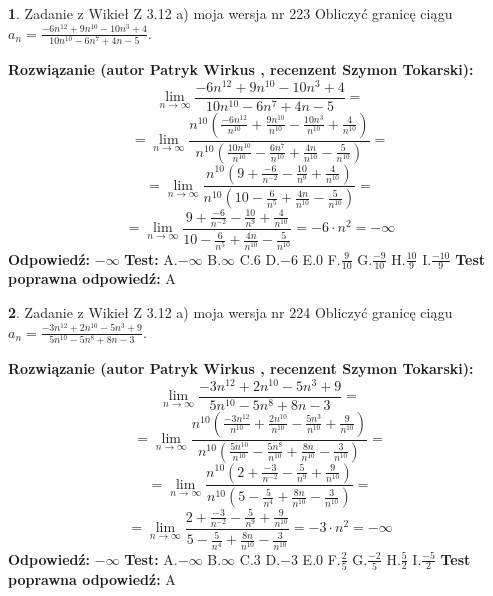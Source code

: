 \documentclass[12pt, a4paper]{article}
\theoremstyle{definition} %
\newtheorem{zad}{}
\newcommand{\zadStart}[1]{\begin{zad}#1\newline}
\newcommand{\zadStop}{\end{zad}}
\newcommand{\rozwStart}[2]{\noindent \textbf{Rozwiązanie (autor #1 , recenzent #2): }\newline}
\newcommand{\rozwStop}{\newline}
\newcommand{\odpStart}{\noindent \textbf{Odpowiedź:}\newline}
\newcommand{\odpStop}{\newline}
\newcommand{\testStart}{\noindent \textbf{Test:}\newline}
\newcommand{\testStop}{\newline}
\newcommand{\kluczStart}{\noindent \textbf{Test poprawna odpowiedź:}\newline}
\newcommand{\kluczStop}{\newline}
\begin{document}
\zadStart{Zadanie z Wikieł Z 3.12 a) moja wersja nr 223}
Obliczyć granicę ciągu $a_{n}=\frac{-6n^{12}+9n^{10}-10n^{3}+4}{10n^{10}-6n^{7}+4n-5}$.
\zadStop
\rozwStart{Patryk Wirkus}{Szymon Tokarski}
$$\lim\limits_{n\to\infty}\frac{-6n^{12}+9n^{10}-10n^{3}+4}{10n^{10}-6n^{7}+4n-5}=$$
$$=\lim\limits_{n\to\infty}\frac{n^{10}\left(\frac{-6n^{12}}{n^{10}}+\frac{9n^{10}}{n^{10}}-\frac{10n^{3}}{n^{10}}+\frac{4}{n^{10}}\right)}{n^{10}\left(\frac{10n^{10}}{n^{10}}-\frac{6n^{7}}{n^{10}}+\frac{4n}{n^{10}}-\frac{5}{n^{10}}\right)}=$$
$$=\lim\limits_{n\to\infty}\frac{n^{10}\left(9+\frac{-6}{n^{-2}}-\frac{10}{n^{9}}+\frac{4}{n^{10}}\right)}
{n^{10}\left(10-\frac{6}{n^{5}}+\frac{4n}{n^{10}}-\frac{5}{n^{10}}\right)}=$$
$$=\lim\limits_{n\to\infty}\frac{9+\frac{-6}{n^{-2}}-\frac{10}{n^{9}}+\frac{4}{n^{10}}}{10-\frac{6}{n^{5}}+\frac{4n}{n^{10}}-\frac{5}{n^{10}}}=-6\cdot n^{2} = -\infty$$
\rozwStop
\odpStart
$-\infty$
\odpStop
\testStart
A.$-\infty$
B.$\infty$
C.$6$
D.$-6$
E.$0$
F.$\frac{9}{10}$
G.$\frac{-9}{10}$
H.$\frac{10}{9}$
I.$\frac{-10}{9}$
\testStop
\kluczStart
A
\kluczStop



\zadStart{Zadanie z Wikieł Z 3.12 a) moja wersja nr 224}
Obliczyć granicę ciągu $a_{n}=\frac{-3n^{12}+2n^{10}-5n^{3}+9}{5n^{10}-5n^{8}+8n-3}$.
\zadStop
\rozwStart{Patryk Wirkus}{Szymon Tokarski}
$$\lim\limits_{n\to\infty}\frac{-3n^{12}+2n^{10}-5n^{3}+9}{5n^{10}-5n^{8}+8n-3}=$$
$$=\lim\limits_{n\to\infty}\frac{n^{10}\left(\frac{-3n^{12}}{n^{10}}+\frac{2n^{10}}{n^{10}}-\frac{5n^{3}}{n^{10}}+\frac{9}{n^{10}}\right)}{n^{10}\left(\frac{5n^{10}}{n^{10}}-\frac{5n^{8}}{n^{10}}+\frac{8n}{n^{10}}-\frac{3}{n^{10}}\right)}=$$
$$=\lim\limits_{n\to\infty}\frac{n^{10}\left(2+\frac{-3}{n^{-2}}-\frac{5}{n^{9}}+\frac{9}{n^{10}}\right)}
{n^{10}\left(5-\frac{5}{n^{4}}+\frac{8n}{n^{10}}-\frac{3}{n^{10}}\right)}=$$
$$=\lim\limits_{n\to\infty}\frac{2+\frac{-3}{n^{-2}}-\frac{5}{n^{9}}+\frac{9}{n^{10}}}{5-\frac{5}{n^{4}}+\frac{8n}{n^{10}}-\frac{3}{n^{10}}}=-3\cdot n^{2} = -\infty$$
\rozwStop
\odpStart
$-\infty$
\odpStop
\testStart
A.$-\infty$
B.$\infty$
C.$3$
D.$-3$
E.$0$
F.$\frac{2}{5}$
G.$\frac{-2}{5}$
H.$\frac{5}{2}$
I.$\frac{-5}{2}$
\testStop
\kluczStart
A
\kluczStop
\end{document}
